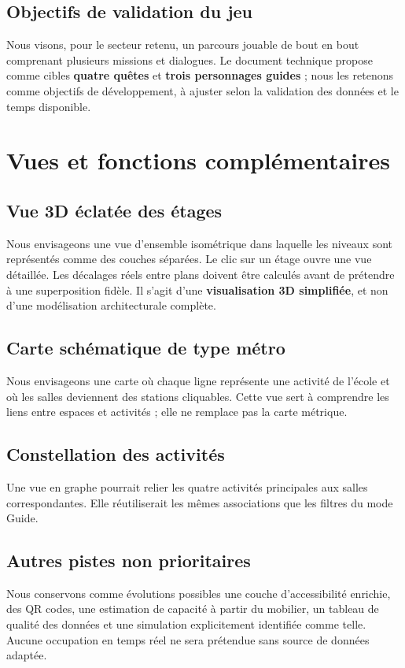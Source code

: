 \documentclass[11pt,a4paper]{article}
\begin{document}
\subsection{Objectifs de validation du jeu}
Nous visons, pour le secteur retenu, un parcours jouable de bout en bout comprenant plusieurs missions et dialogues. Le document technique propose comme cibles \textbf{quatre quêtes} et \textbf{trois personnages guides} ; nous les retenons comme objectifs de développement, à ajuster selon la validation des données et le temps disponible.

\section{Vues et fonctions complémentaires}
\subsection{Vue 3D éclatée des étages}
Nous envisageons une vue d'ensemble isométrique dans laquelle les niveaux sont représentés comme des couches séparées. Le clic sur un étage ouvre une vue détaillée. Les décalages réels entre plans doivent être calculés avant de prétendre à une superposition fidèle. Il s'agit d'une \textbf{visualisation 3D simplifiée}, et non d'une modélisation architecturale complète.

\subsection{Carte schématique de type métro}
Nous envisageons une carte où chaque ligne représente une activité de l'école et où les salles deviennent des stations cliquables. Cette vue sert à comprendre les liens entre espaces et activités ; elle ne remplace pas la carte métrique.

\subsection{Constellation des activités}
Une vue en graphe pourrait relier les quatre activités principales aux salles correspondantes. Elle réutiliserait les mêmes associations que les filtres du mode Guide.

\subsection{Autres pistes non prioritaires}
Nous conservons comme évolutions possibles une couche d'accessibilité enrichie, des QR codes, une estimation de capacité à partir du mobilier, un tableau de qualité des données et une simulation explicitement identifiée comme telle. Aucune occupation en temps réel ne sera prétendue sans source de données adaptée.
\end{document}
